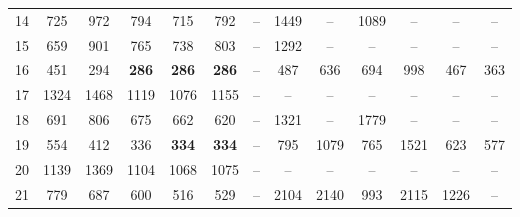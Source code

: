 \begin{table}[H]
{\begin{tabular}{c|cccccccccccc}
            14 & 725            & 972           & 794           & 715           & 792           & --            & 1449          & --            & 1089          & --            & --            & --            \\ 
            15 & 659            & 901           & 765           & 738           & 803           & --            & 1292          & --            & --            & --            & --            & --            \\ 
            16 & 451            & 294           & \textbf{286}  & \textbf{286}  & \textbf{286}  & --            & 487           & 636           & 694           & 998           & 467           & 363           \\ 
            17 & 1324           & 1468          & 1119          & 1076          & 1155          & --            & --            & --            & --            & --            & --            & --            \\ 
            18 & 691            & 806           & 675           & 662           & 620           & --            & 1321          & --            & 1779          & --            & --            & --            \\ 
            19 & 554            & 412           & 336           & \textbf{334}  & \textbf{334}  & --            & 795           & 1079          & 765           & 1521          & 623           & 577           \\ 
            20 & 1139           & 1369          & 1104          & 1068          & 1075          & --            & --            & --            & --            & --            & --            & --            \\ 
            21 & 779            & 687           & 600           & 516           & 529           & --            & 2104          & 2140          & 993           & 2115          & 1226          & --            \\ 
            \bottomrule
        \end{tabular}
    }
\end{table}

